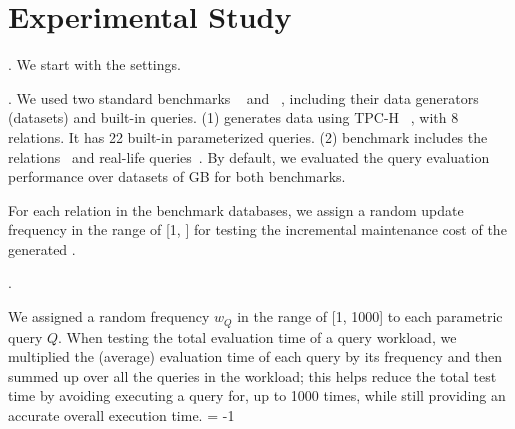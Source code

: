 \vspace{2ex}
\section{Experimental Study}
\label{sec-expt}



. We start with the settings.

. We used two standard benchmarks
\tpch~\cite{tpch} and \imdb~\cite{LeisGMBK015}, including their
data generators (datasets) and built-in queries.
(1) \tpch generates data using {\small TPC-H}
~\cite{tpch}, with 8 relations. It has 22 built-in
parameterized \SQL queries.
(2) \imdb benchmark includes the \imdb relations~\cite{imdbdata}
and \xx real-life \SQL queries~\cite{imdbquery}.
By default, we evaluated the query evaluation performance over
datasets of \xx GB for both benchmarks.

For each relation in the benchmark databases, we assign a random
update frequency in the range of [1, ] for testing the
incremental maintenance cost of the generated \bdss. 


.

\vspace{0.6ex}
We assigned a random frequency $w_{Q}$ in the range
of [1, 1000] to each
parametric query $Q$. When testing the total
evaluation time of a query workload, we multiplied the (average)
evaluation time of each query by its frequency and then summed up
over all the queries in the workload; this helps reduce the total
test time by avoiding executing a query for, \eg up to 1000
times, while still providing an accurate overall execution time.
\looseness = -1


